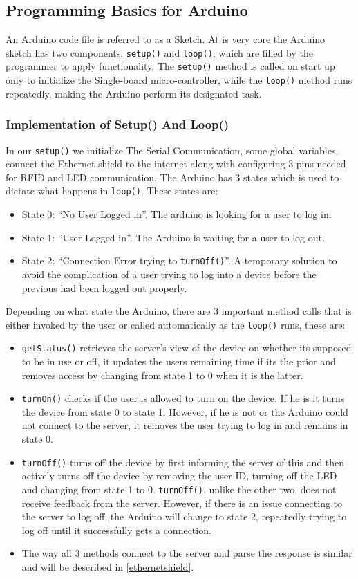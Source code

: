 \subsection{Programming Basics for Arduino}

An Arduino code file is referred to as a Sketch. At is very core the Arduino sketch has two components, \verb|setup()| and \verb|loop()|, which are filled by the programmer to apply functionality.
The \verb|setup()| method is called on start up only to initialize the Single-board micro-controller, while the \verb|loop()| method runs repeatedly, making the Arduino perform its designated task.

\subsubsection*{Implementation of Setup() And Loop()}
In our \verb|setup()| we initialize The Serial Communication, some global variables, connect the Ethernet shield to the internet along with configuring 3 pins needed for RFID and LED communication.\newline
The Arduino has 3 states which is used to dictate what happens in \verb|loop()|. These states are:
\begin{itemize}
	\item State 0: ``No User Logged in''. The arduino is looking for a user to log in.
	\item State 1: ``User Logged in''. The Arduino is waiting for a user to log out.
	\item State 2: ``Connection Error trying to \verb|turnOff()|''. A temporary solution to avoid the complication of a user trying to log into a device before the previous had been logged out properly.
\end{itemize}
Depending on what state the Arduino, there are 3 important method calls that is either invoked by the user or called automatically as the \verb|loop()| runs, these are:
\begin{itemize}
	\item \verb|getStatus()| retrieves the server's view of the device on whether its supposed to be in use or off, it updates the users remaining time if its the prior and removes access by changing from state 1 to 0 when it is the latter.
	\item \verb|turnOn()| checks if the user is allowed to turn on the device. If he is it turns the device from state 0 to state 1. However, if he is not or the Arduino could not connect to the server, it removes the user trying to log in and remains in state 0.
	\item \verb|turnOff()| turns off the device by first informing the server of this and then actively turns off the device by removing the user ID, turning off the LED and changing from state 1 to 0. \verb|turnOff()|, unlike the other two, does not receive feedback from the server. However, if there is an issue connecting to the server to log off, the Arduino will change to state 2, repeatedly trying to log off until it successfully gets a connection.
	\item The way all 3 methods connect to the server and parse the response is similar and will be described in \autoref{ethernetshield}.
\end{itemize}
